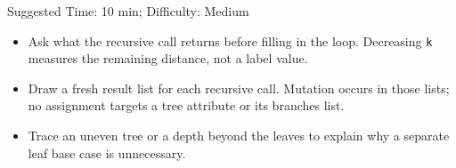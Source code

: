 \begin{questionmeta}
Suggested Time: 10 min; Difficulty: Medium
\begin{itemize}
    \item Ask what the recursive call returns before filling in the loop.
    Decreasing \lstinline{k} measures the remaining distance, not a label value.
    \item Draw a fresh result list for each recursive call. Mutation occurs in
    those lists; no assignment targets a tree attribute or its branches list.
    \item Trace an uneven tree or a depth beyond the leaves to explain why a
    separate leaf base case is unnecessary.
\end{itemize}
\end{questionmeta}
